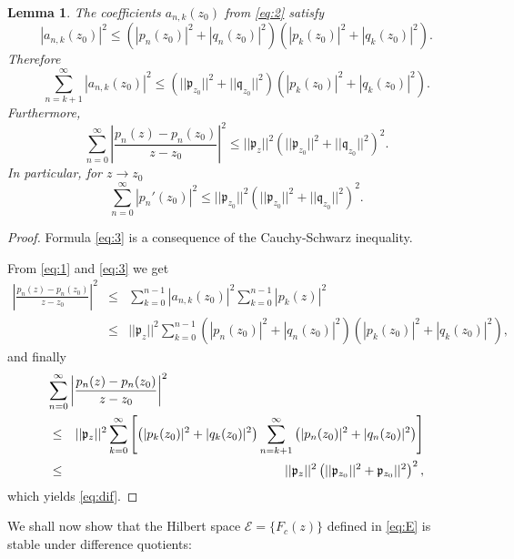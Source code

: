\documentclass [12pt]{article}
\newtheorem{lem}[thm]{Lemma}
\begin{document}
\begin{lem}\label{thm:ank} The coefficients $a_{n,k}(z_0)$ from \eqref{eq:2}
satisfy
\begin{equation}\label{eq:3}
|a_{n,k}(z_0)|^2\le \left(|p_n(z_0)|^2+|q_n(z_0)|^2\right)\left(|p_k(z_0)|^2+|q_k(z_0)|^2\right).
\end{equation}
Therefore
\begin{equation}\label{eq:3bis}
\sum_{n=k+1}^\infty |a_{n,k}(z_0)|^2\le (||\mathfrak{p}_{z_0}||^2+||\mathfrak{q}_{z_0}||^2)(|p_k(z_0)|^2+|q_k(z_0)|^2).
\end{equation}
Furthermore,
\begin{equation}\label{eq:dif}
\sum_{n=0}^\infty\left|\frac{p_n(z)-p_n(z_0)}{z-z_0}\right|^2\le ||\mathfrak{p}_z||^2\left(||\mathfrak{p}_{z_0}||^2+||\mathfrak{q}_{z_0}||^2\right)^2.
\end{equation}
In particular, for $z\to z_0$
\begin{equation*}\label{eq:diff}
\sum_{n=0}^\infty|p_n'(z_0)|^2\le ||\mathfrak{p}_{z_0}||^2\left(||\mathfrak{p}_{z_0}||^2+||\mathfrak{q}_{z_0}||^2\right)^2.
\end{equation*}
 \end{lem} 
 
 \begin{proof} Formula \eqref{eq:3} is a consequence of the Cauchy-Schwarz inequality.

From \eqref{eq:1} and \eqref{eq:3} we get
\begin{eqnarray*}
\left|\frac{p_n(z)-p_n(z_0)}{z-z_0}\right|^2 &\le& \sum_{k=0}^{n-1} |a_{n,k}(z_0)|^2\sum_{k=0}^{n-1} |p_k(z)|^2\\
&\le& ||\mathfrak{p}_z||^2\sum_{k=0}^{n-1} \left(|p_n(z_0)|^2+|q_n(z_0)|^2\right) \left(|p_k(z_0)|^2+|q_k(z_0)|^2\right),
\end{eqnarray*} 
and finally
\begin{eqnarray*}
\lefteqn{\sum_{n=0}^\infty \left|\frac{p_n(z)-p_n(z_0)}{z-z_0}\right|^2 }\\
&\le & ||\mathfrak{p}_z||^2
\sum_{k=0}^\infty \left[\left(|p_k(z_0)|^2+|q_k(z_0)|^2\right) \sum_{n=k+1}^\infty
 \left(|p_n(z_0)|^2+|q_n(z_0)|^2\right)\right]\\
&\le& ||\mathfrak{p}_z||^2 \left(||\mathfrak{p}_{z_0}||^2+\mathfrak{p}_{z_0}||^2\right)^2,
\end{eqnarray*}
which yields \eqref{eq:dif}.
\end{proof} 

We shall now show that the Hilbert space $\mathcal E=\{F_c(z)\}$ defined in \eqref{eq:E} is stable under difference quotients:
  
\end{document}
